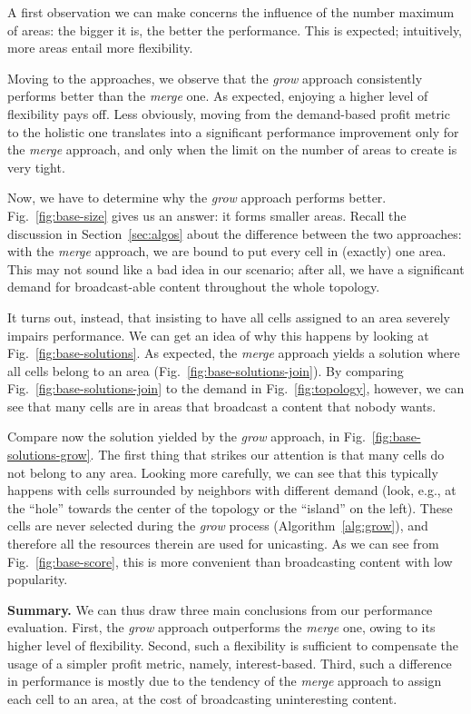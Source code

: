 \documentclass[10pt, conference, compsocconf]{IEEEtran}
\numberwithin{equation}{section}
\begin{document}
A first observation we can make concerns the influence of the number
maximum of areas: the bigger it is, the better the performance. This is
expected; intuitively, more areas entail more flexibility. 


Moving to the approaches, we observe that the {\em grow} approach
consistently performs better than the {\em merge} one. As expected,
enjoying a higher level of flexibility pays off. Less obviously, moving
from the demand-based profit metric to the holistic one translates into
a significant performance improvement only for the {\em merge} approach,
and only when the limit on the number of areas to create is very tight.



Now, we have to determine why the {\em grow} approach performs better.
Fig.~\ref{fig:base-size} gives us an answer: it forms smaller areas.
Recall the discussion in Section~\ref{sec:algos} about the difference
between the two approaches: with the {\em merge} approach, we are bound
to put every cell in (exactly) one area. This may not sound like a bad idea
in our scenario; after all, we have a significant demand for
broadcast-able content throughout the whole topology.

It turns out, instead, that insisting to have all cells assigned to an
area severely impairs performance. We can get an idea of why this
happens by looking at Fig.~\ref{fig:base-solutions}. As expected, the
{\em merge} approach yields a solution where all cells belong to an area
(Fig.~\ref{fig:base-solutions-join}). By comparing
Fig.~\ref{fig:base-solutions-join} to the demand in
Fig.~\ref{fig:topology}, however, we can see that many cells are in
areas that broadcast a content that nobody wants. 


Compare now the solution yielded by the {\em grow} approach, in
Fig.~\ref{fig:base-solutions-grow}. The first thing that strikes our
attention is that many cells do not belong to any area. Looking more
carefully, we can see that this typically happens with cells surrounded
by neighbors with different demand (look, e.g., at the ``hole'' towards
the center of the topology or the ``island'' on the left). These cells are
never selected during the {\em grow} process (Algorithm~\ref{alg:grow}), and
therefore all the resources therein are used for unicasting. As we can
see from Fig.~\ref{fig:base-score}, this is more convenient than
broadcasting content with low popularity.

\noindent
{\bf Summary.}
We can thus draw three main conclusions from our performance evaluation.
First, the {\em grow} approach outperforms the {\em merge} one, owing to
its higher level of flexibility. Second, such a flexibility is
sufficient to compensate the usage of a simpler profit metric, namely,
interest-based. Third, such a difference in performance is mostly due to
the tendency of the {\em merge} approach to assign each cell to an area,
at the cost of broadcasting uninteresting content.
\end{document}
